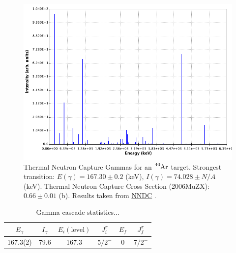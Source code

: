 \documentclass[8pt]{refart}
\begin{document}
\begin{figure}[H]
    \centering
    \includegraphics[width=\linewidth]{graphics/thermalgammaspectrum.png}
    \caption{Thermal Neutron Capture Gammas for an $\ce{^{40}Ar}$ target. Strongest transition: $E(\gamma) = 167.30 \pm 0.2$ (keV), $I(\gamma) = 74.028 \pm N/A$ (keV).  Thermal Neutron Capture Cross Section (2006MuZX): $0.66 \pm 0.01$ (b).  Results taken from \href{https://www.nndc.bnl.gov/capgam/byTarget/z018_40Ar.html}{NNDC} \cite{NNDC}.}
    \label{fig:my_label}
\end{figure}

\begin{table}[H]
    \centering
    \begin{tabular}{|c|c|c|c|c|c|}
        \hline
        $E_{\gamma}$ & $I_{\gamma}$ & $E_i(\mathrm{level})$ & $J_i^{\pi}$ & $E_f$ & $J_f^{\pi}$\\
        \hline
        \hline
        167.3(2) & 79.6 & 167.3 & $5/2^-$ & 0 & $7/2^{-}$\\
        \hline 
    \end{tabular}
    \caption{Gamma cascade statistics...}
    \label{tab:my_label}
\end{table}
\end{document}

